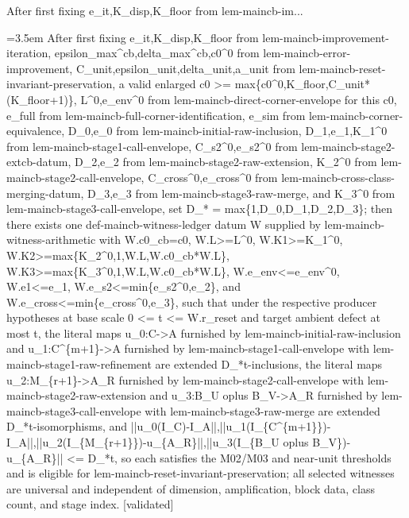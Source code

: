 \documentclass{article}
\newcommand{\step}[1]{\par\noindent\hangindent=3.5em\hangafter=1%
  \makebox[3.5em][l]{\textbf{#1.}}}
\newcommand{\steptag}[1]{\hfill{\small\textsf{[#1]}}}
\begin{document}
\begin{proofbox}{After first fixing e\_it,K\_disp,K\_floor from lem-maincb-im...}
\step{1} After first fixing e\_it,K\_disp,K\_floor from lem-maincb-improvement-iteration, epsilon\_max\textasciicircum{}cb,delta\_max\textasciicircum{}cb,c0\textasciicircum{}0 from lem-maincb-error-improvement, C\_unit,epsilon\_unit,delta\_unit,a\_unit from lem-maincb-reset-invariant-preservation, a valid enlarged c0 >= max\{c0\textasciicircum{}0,K\_floor,C\_unit*(K\_floor+1)\}, L\textasciicircum{}0,e\_env\textasciicircum{}0 from lem-maincb-direct-corner-envelope for this c0, e\_full from lem-maincb-full-corner-identification, e\_sim from lem-maincb-corner-equivalence, D\_0,e\_0 from lem-maincb-initial-raw-inclusion, D\_1,e\_1,K\_1\textasciicircum{}0 from lem-maincb-stage1-call-envelope, C\_s2\textasciicircum{}0,e\_s2\textasciicircum{}0 from lem-maincb-stage2-extcb-datum, D\_2,e\_2 from lem-maincb-stage2-raw-extension, K\_2\textasciicircum{}0 from lem-maincb-stage2-call-envelope, C\_cross\textasciicircum{}0,e\_cross\textasciicircum{}0 from lem-maincb-cross-class-merging-datum, D\_3,e\_3 from lem-maincb-stage3-raw-merge, and K\_3\textasciicircum{}0 from lem-maincb-stage3-call-envelope, set D\_* = max\{1,D\_0,D\_1,D\_2,D\_3\}; then there exists one def-maincb-witness-ledger datum W supplied by lem-maincb-witness-arithmetic with W.c0\_cb=c0, W.L>=L\textasciicircum{}0, W.K1>=K\_1\textasciicircum{}0, W.K2>=max\{K\_2\textasciicircum{}0,1,W.L,W.c0\_cb*W.L\}, W.K3>=max\{K\_3\textasciicircum{}0,1,W.L,W.c0\_cb*W.L\}, W.e\_env<=e\_env\textasciicircum{}0, W.e1<=e\_1, W.e\_s2<=min\{e\_s2\textasciicircum{}0,e\_2\}, and W.e\_cross<=min\{e\_cross\textasciicircum{}0,e\_3\}, such that under the respective producer hypotheses at base scale 0 <= t <= W.r\_reset and target ambient defect at most t, the literal maps u\_0:C->A furnished by lem-maincb-initial-raw-inclusion and u\_1:C\textasciicircum{}\{m+1\}->A furnished by lem-maincb-stage1-call-envelope with lem-maincb-stage1-raw-refinement are extended D\_*t-inclusions, the literal maps u\_2:M\_\{r+1\}->A\_R furnished by lem-maincb-stage2-call-envelope with lem-maincb-stage2-raw-extension and u\_3:B\_U oplus B\_V->A\_R furnished by lem-maincb-stage3-call-envelope with lem-maincb-stage3-raw-merge are extended D\_*t-isomorphisms, and ||u\_0(I\_C)-I\_A||,||u\_1(I\_\{C\textasciicircum{}\{m+1\}\})-I\_A||,||u\_2(I\_\{M\_\{r+1\}\})-u\_\{A\_R\}||,||u\_3(I\_\{B\_U oplus B\_V\})-u\_\{A\_R\}|| <= D\_*t, so each satisfies the M02/M03 and near-unit thresholds and is eligible for lem-maincb-reset-invariant-preservation; all selected witnesses are universal and independent of dimension, amplification, block data, class count, and stage index. \steptag{validated} \\[6pt]

\end{proofbox}
\end{document}
